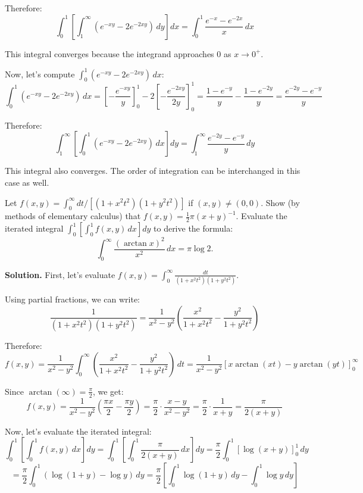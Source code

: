 \begin{enumerate}[label=(\alph*)]
    Therefore:
    \[\int_{0}^{1} \left[ \int_{1}^{\infty} (e^{-xy} - 2e^{-2xy}) \, dy \right] dx = \int_{0}^{1} \frac{e^{-x} - e^{-2x}}{x} \, dx\]
    
    This integral converges because the integrand approaches 0 as $x \to 0^+$.
    
    Now, let's compute $\int_{0}^{1} (e^{-xy} - 2e^{-2xy}) \, dx$:
    \[\int_{0}^{1} (e^{-xy} - 2e^{-2xy}) \, dx = \left[-\frac{e^{-xy}}{y}\right]_{0}^{1} - 2\left[-\frac{e^{-2xy}}{2y}\right]_{0}^{1} = \frac{1 - e^{-y}}{y} - \frac{1 - e^{-2y}}{y} = \frac{e^{-2y} - e^{-y}}{y}\]
    
    Therefore:
    \[\int_{1}^{\infty} \left[ \int_{0}^{1} (e^{-xy} - 2e^{-2xy}) \, dx \right] dy = \int_{1}^{\infty} \frac{e^{-2y} - e^{-y}}{y} \, dy\]
    
    This integral also converges. The order of integration can be interchanged in this case as well.
\end{enumerate}

\begin{problembox}
Let $f(x, y) = \int_{0}^{\infty} dt / [(1 + x^{2}t^{2})(1 + y^{2}t^{2})]$ if $(x, y) \neq (0, 0)$. Show (by methods of elementary calculus) that $f(x, y) = \frac{1}{2}\pi(x + y)^{-1}$. Evaluate the iterated integral $\int_{0}^{1} \left[ \int_{0}^{1} f(x, y) \, dx \right] dy$ to derive the formula:
\[\int_{0}^{\infty} \frac{(\arctan x)^{2}}{x^{2}} \, dx = \pi \log 2.\]
\end{problembox}

\noindent\textbf{Solution.}
First, let's evaluate $f(x, y) = \int_{0}^{\infty} \frac{dt}{(1 + x^{2}t^{2})(1 + y^{2}t^{2})}$.

Using partial fractions, we can write:
\[\frac{1}{(1 + x^{2}t^{2})(1 + y^{2}t^{2})} = \frac{1}{x^{2} - y^{2}} \left(\frac{x^{2}}{1 + x^{2}t^{2}} - \frac{y^{2}}{1 + y^{2}t^{2}}\right)\]

Therefore:
\[f(x, y) = \frac{1}{x^{2} - y^{2}} \int_{0}^{\infty} \left(\frac{x^{2}}{1 + x^{2}t^{2}} - \frac{y^{2}}{1 + y^{2}t^{2}}\right) \, dt = \frac{1}{x^{2} - y^{2}} \left[x \arctan(xt) - y \arctan(yt)\right]_{0}^{\infty}\]

Since $\arctan(\infty) = \frac{\pi}{2}$, we get:
\[f(x, y) = \frac{1}{x^{2} - y^{2}} \left(\frac{\pi x}{2} - \frac{\pi y}{2}\right) = \frac{\pi}{2} \cdot \frac{x - y}{x^{2} - y^{2}} = \frac{\pi}{2} \cdot \frac{1}{x + y} = \frac{\pi}{2(x + y)}\]

Now, let's evaluate the iterated integral:
\[\int_{0}^{1} \left[ \int_{0}^{1} f(x, y) \, dx \right] dy = \int_{0}^{1} \left[ \int_{0}^{1} \frac{\pi}{2(x + y)} \, dx \right] dy = \frac{\pi}{2} \int_{0}^{1} \left[ \log(x + y) \right]_{0}^{1} \, dy\]
\[= \frac{\pi}{2} \int_{0}^{1} (\log(1 + y) - \log y) \, dy = \frac{\pi}{2} \left[ \int_{0}^{1} \log(1 + y) \, dy - \int_{0}^{1} \log y \, dy \right]\]


